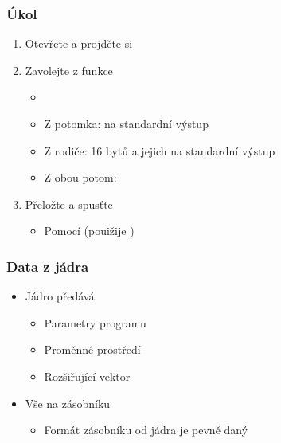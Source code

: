 \begin{frame}
  \frametitle{Úkol}

  \begin{enumerate}
    \item Otevřete a projděte si 
    \item Zavolejte z funkce 
    \begin{itemize}
      \item {}
      \item Z potomka:  na standardní výstup
      \item Z rodiče:  16 bytů a jejich  na standardní
	výstup
      \item Z obou potom: 
    \end{itemize}

    \item Přeložte a spusťte
    \begin{itemize}
      \item Pomocí  (pouižije )
    \end{itemize}
  \end{enumerate}

\end{frame}

\begin{frame}
  \frametitle{Data z jádra}

  \begin{itemize}
    \item Jádro předává
    \begin{itemize}
      \item Parametry programu
      \item Proměnné prostředí
      \item Rozšiřující vektor
    \end{itemize}

    \pause

    \item Vše na zásobníku
    \begin{itemize}
      \item Formát zásobníku od jádra je pevně daný
    \end{itemize}
  \end{itemize}

\end{frame}

